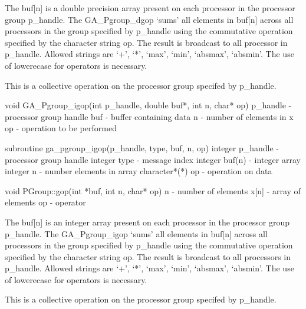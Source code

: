 \documentclass[12pt]{article}
\begin{document}
\begin{desc}

The buf[n] is a double precision array present on each processor in the processor group p_handle. The GA_Pgroup_dgop `sums' all elements in buf[n] across all processors in the group specified by p_handle using the commutative operation specified by the character string op.  The result is broadcast to all processor in p_handle. Allowed strings are `+', `*', `max', `min', `absmax', `absmin'. The use of lowerecase for operators is necessary.

This is a collective operation on the processor group specifed by p_handle. 
\end{desc}


\begin{capi}
void GA_Pgroup_igop(int p_handle, double buf*, int n, char* op)
   p_handle                      - processor group handle                  \access{[input]} 
   buf                           - buffer containing data            
   n                             - number of elements in x                 \access{[input]} 
   op                            - operation to be performed               \access{[input]} 
\end{capi}

\begin{fapi}
subroutine ga_pgroup_igop(p_handle, type, buf, n, op)
   integer p_handle              - processor group handle                  \access{[input]} 
   integer type                  - message index                           \access{[input]} 
   integer buf(n)                - integer array                     
   integer n                     - number elements in array                \access{[input]} 
   character*(*) op              - operation on data                       \access{[input]} 
\end{fapi}

\begin{cxxapi}
void PGroup::gop(int *buf, int n, char* op)
   n              - number of elements                                     \access{[input]}
   x[n]           - array of elements                               
   op             - operator                                               \access{[input]}
\end{cxxapi}

\begin{desc}

The buf[n] is an integer array present on each processor in the processor group p_handle. The GA_Pgroup_igop `sums' all elements in buf[n] across all processors in the group specified by p_handle using the commutative operation specified by the character string op.  The result is broadcast to all processors in p_handle. Allowed strings are `+', `*', `max', `min', `absmax', `absmin'. The use of lowerecase for operators is necessary.

This is a collective operation on the processor group specifed by p_handle. 
\end{desc}
\end{document}
